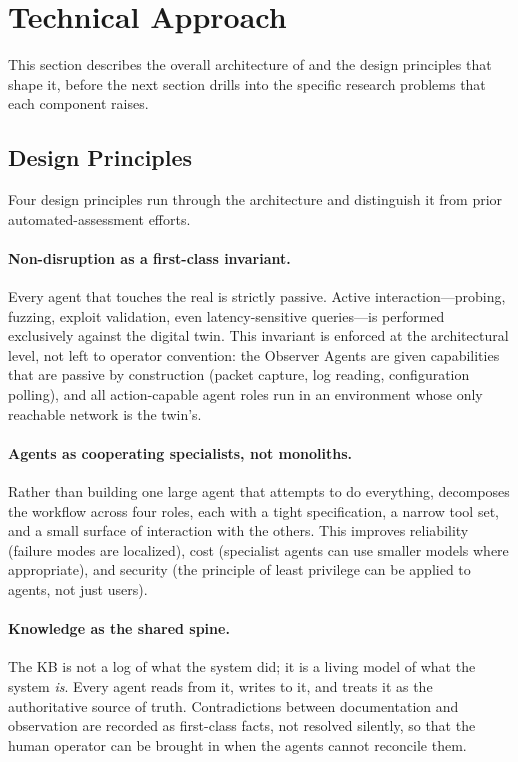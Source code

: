 \section{Technical Approach}
\label{sec:approach}

This section describes the overall architecture of \sysname and the
design principles that shape it, before the next section drills into
the specific research problems that each component raises.

\subsection{Design Principles}
\label{sec:approach-principles}

Four design principles run through the \sysname architecture and
distinguish it from prior automated-assessment efforts.

\paragraph{Non-disruption as a first-class invariant.}
Every agent that touches the real \cps is strictly passive. Active
interaction---probing, fuzzing, exploit validation, even latency-sensitive
queries---is performed exclusively against the digital twin. This
invariant is enforced at the architectural level, not left to operator
convention: the Observer Agents are given capabilities that are
passive by construction (packet capture, log reading, configuration
polling), and all action-capable agent roles run in an environment
whose only reachable network is the twin's.

\paragraph{Agents as cooperating specialists, not monoliths.}
Rather than building one large agent that attempts to do everything,
\sysname decomposes the workflow across four roles, each with a tight
specification, a narrow tool set, and a small surface of interaction
with the others. This improves reliability (failure modes are
localized), cost (specialist agents can use smaller models where
appropriate), and security (the principle of least privilege can be
applied to agents, not just users).

\paragraph{Knowledge as the shared spine.}
The KB is not a log of what the system did; it is a living model of
what the system \emph{is}. Every agent reads from it, writes to it, and
treats it as the authoritative source of truth. Contradictions between
documentation and observation are recorded as first-class facts, not
resolved silently, so that the human operator can be brought in when
the agents cannot reconcile them.

